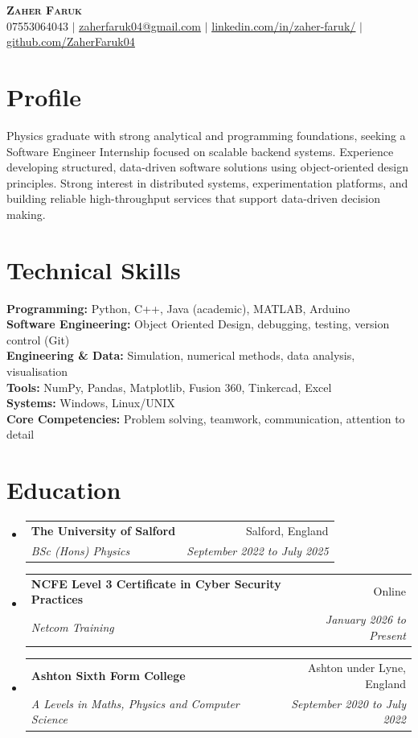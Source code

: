 \documentclass[letterpaper,11pt]{article}
\makeatletter
\newcommand{\resumeSubheading}[4]{
  \vspace{-2pt}\item
    \begin{tabular*}{0.97\textwidth}[t]{l@{\extracolsep{\fill}}r}
      \textbf{#1} & #2 \\
      \textit{\small#3} & \textit{\small #4} \\
    \end{tabular*}\vspace{-7pt}
}
\newcommand{\resumeSubHeadingListStart}{\begin{itemize}[leftmargin=0.15in, label={}]}
\newcommand{\resumeSubHeadingListEnd}{\end{itemize}}
\makeatother
\begin{document}
\begin{center}
    \textbf{\Huge \scshape Zaher Faruk} \\ \vspace{1pt}
    \small 07553064043 $|$ \href{mailto:zaherfaruk04@gmail.com}{\underline{zaherfaruk04@gmail.com}} $|$
    \href{https://www.linkedin.com/in/zaher-faruk/}{\underline{linkedin.com/in/zaher-faruk/}} $|$
    \href{https://github.com/ZaherFaruk04}{\underline{github.com/ZaherFaruk04}}
\end{center}

\section{Profile}
\small{
Physics graduate with strong analytical and programming foundations, seeking a Software Engineer Internship focused on scalable backend systems. Experience developing structured, data-driven software solutions using object-oriented design principles. Strong interest in distributed systems, experimentation platforms, and building reliable high-throughput services that support data-driven decision making.
}



\section{Technical Skills}
\small{
\textbf{Programming:} Python, C++, Java (academic), MATLAB, Arduino \\
\textbf{Software Engineering:} Object Oriented Design, debugging, testing, version control (Git) \\
\textbf{Engineering \& Data:} Simulation, numerical methods, data analysis, visualisation \\
\textbf{Tools:} NumPy, Pandas, Matplotlib, Fusion 360, Tinkercad, Excel \\
\textbf{Systems:} Windows, Linux/UNIX \\
\textbf{Core Competencies:} Problem solving, teamwork, communication, attention to detail
}

\section{Education}
\resumeSubHeadingListStart
  \resumeSubheading
    {The University of Salford}{Salford, England}
    {BSc (Hons) Physics}{September 2022 to July 2025}
  \resumeSubheading
    {NCFE Level 3 Certificate in Cyber Security Practices}{Online}
    {Netcom Training}{January 2026 to Present}
  \resumeSubheading
    {Ashton Sixth Form College}{Ashton under Lyne, England}
    {A Levels in Maths, Physics and Computer Science}{September 2020 to July 2022}
\resumeSubHeadingListEnd
\end{document}
